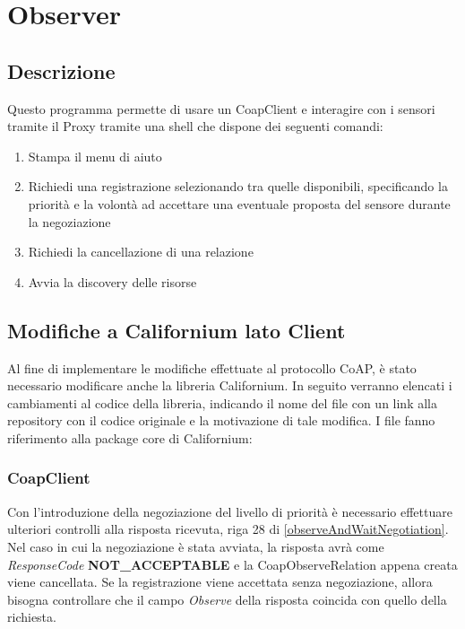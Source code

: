 \chapter{Observer}
	\section {Descrizione}
		Questo programma permette di usare un CoapClient e interagire con i sensori tramite il Proxy tramite una shell che dispone dei seguenti comandi:
		\begin{enumerate}
			\item Stampa il menu di aiuto
			\item Richiedi una registrazione selezionando tra quelle disponibili, specificando la priorità e la volontà ad accettare una eventuale proposta del sensore durante la negoziazione
			\item Richiedi la cancellazione di una relazione
			\item Avvia la discovery delle risorse
		\end{enumerate}
	\section {Modifiche a Californium lato Client}
			Al fine di implementare le modifiche effettuate al protocollo CoAP, è stato necessario modificare anche la libreria Californium. In seguito verranno elencati i cambiamenti al codice della libreria, indicando il nome del file con un link alla repository con il codice originale e la motivazione di tale modifica. I file fanno riferimento alla package core di Californium:

			\subsection{CoapClient}\label{CoapClient}
				Con l'introduzione della negoziazione del livello di priorità è necessario effettuare ulteriori controlli alla risposta ricevuta, riga 28 di \ref{observeAndWaitNegotiation}. Nel caso in cui la negoziazione è stata avviata, la risposta avrà come \textit{ResponseCode} \textbf{NOT\_ACCEPTABLE} e la CoapObserveRelation appena creata viene cancellata. Se la registrazione viene accettata senza negoziazione, allora bisogna controllare che il campo \textit{Observe} della risposta coincida con quello della richiesta.\newline
				


